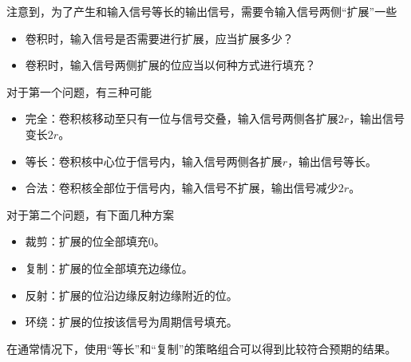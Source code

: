 注意到，为了产生和输入信号等长的输出信号，需要令输入信号两侧“扩展”一些
\begin{itemize}
    \item 卷积时，输入信号是否需要进行扩展，应当扩展多少？
    \item 卷积时，输入信号两侧扩展的位应当以何种方式进行填充？
\end{itemize}
对于第一个问题，有三种可能
\begin{itemize}
    \item 完全：卷积核移动至只有一位与信号交叠，输入信号两侧各扩展$2r$，输出信号变长$2r$。
    \item 等长：卷积核中心位于信号内，输入信号两侧各扩展$r$，输出信号等长。
    \item 合法：卷积核全部位于信号内，输入信号不扩展，输出信号减少$2r$。
\end{itemize}
对于第二个问题，有下面几种方案
\begin{itemize}
    \item 裁剪：扩展的位全部填充$0$。
    \item 复制：扩展的位全部填充边缘位。
    \item 反射：扩展的位沿边缘反射边缘附近的位。
    \item 环绕：扩展的位按该信号为周期信号填充。
\end{itemize}
在通常情况下，使用“等长”和“复制”的策略组合可以得到比较符合预期的结果。